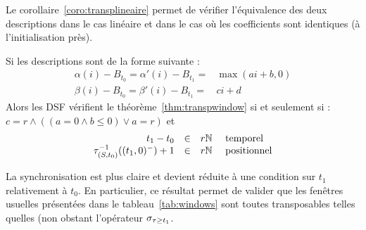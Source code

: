 Le corollaire~\ref{coro:transplineaire} permet de vérifier l'équivalence des deux descriptions dans le cas linéaire et dans le cas où les coefficients sont identiques (à l'initialisation près). 
\begin{coro}\label{coro:transplineaire}
    Si les descriptions sont de la forme suivante :
$$\begin{array}{ll} \alpha(i) - B_{t_0} = \alpha'(i)-B_{t_1} = & \max(ai+b,0)\\ \beta(i) - B_{t_0} = \beta'(i)-B_{t_1} = & ci+d \end{array}$$
    Alors les DSF vérifient le théorème~\ref{thm:transpwindow} si et seulement si : $c = r \wedge ((a = 0 \wedge b\leq 0) \vee a = r)$ et
$$\begin{array}{rcl} t_1 - t_0 & \in & r\mathbb{N} \quad \textrm{\ temporel}\\ \tau_{(S,t_0)}^{-1} ((t_1,0)^-)+1 & \in & r\mathbb{N} \quad \textrm{\ positionnel} \end{array}$$
\end{coro}

La synchronisation est plus claire et devient réduite à une condition sur $t_1$ relativement à $t_0$. En particulier, ce résultat permet de valider que les fenêtres usuelles présentées dans le tableau~\ref{tab:windows} sont toutes transposables telles quelles (non obstant l'opérateur $\sigma_{\tau\geq t_1}$.
